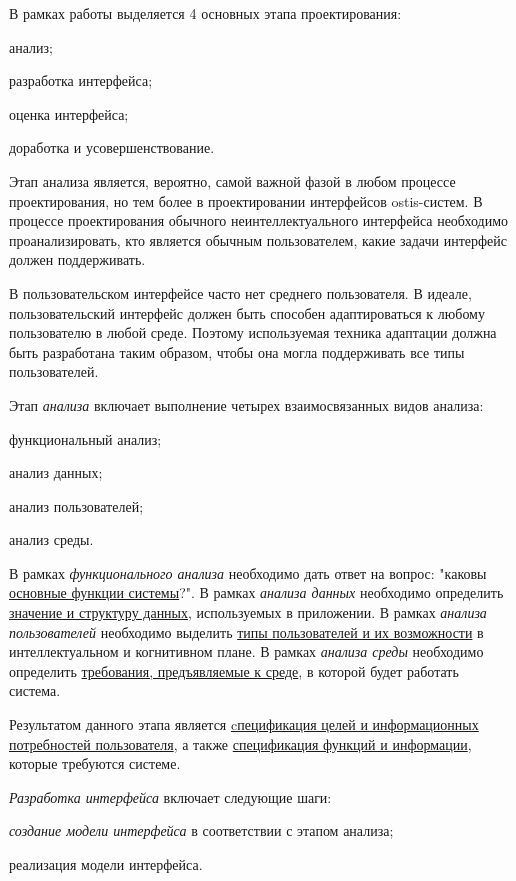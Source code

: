 В рамках работы  выделяется 4 основных этапа проектирования:
\begin{textitemize}
    \item анализ;
    \item разработка интерфейса;
    \item оценка интерфейса;
    \item доработка и усовершенствование.
\end{textitemize}

Этап анализа является, вероятно, самой важной фазой в любом процессе проектирования, но тем более в проектировании интерфейсов ostis-систем. В
процессе проектирования обычного неинтеллектуального интерфейса
необходимо проанализировать, кто является обычным пользователем, какие задачи интерфейс должен поддерживать. 

В пользовательском интерфейсе часто нет среднего пользователя.
В идеале, пользовательский интерфейс должен быть способен адаптироваться к любому пользователю в любой среде. Поэтому используемая техника адаптации должна быть разработана таким образом, чтобы она могла поддерживать все типы пользователей.

Этап \textit{анализа} включает выполнение четырех взаимосвязанных видов анализа:
\begin{textitemize}
    \item функциональный анализ;
    \item анализ данных;
    \item анализ пользователей;
    \item анализ среды.
\end{textitemize}

В рамках \textit{функционального анализа} необходимо дать ответ на вопрос: "каковы \uline{основные функции системы}?".
В рамках \textit{анализа данных} необходимо определить \uline{значение и структуру данных}, используемых в приложении.
В рамках \textit{анализа пользователей} необходимо выделить \uline{типы пользователей и их возможности} в интеллектуальном
и когнитивном плане.
В рамках \textit{анализа среды} необходимо определить \uline{требования, предъявляемые к среде}, в которой будет работать система.

Результатом данного этапа является \uline{cпецификация целей и информационных потребностей пользователя}, а также
\uline{спецификация функций и информации}, которые требуются системе.

\textit{Разработка интерфейса} включает следующие шаги:
\begin{textitemize}
	\item \textit{создание модели интерфейса} в соответствии с этапом анализа;
	\item реализация модели интерфейса.
\end{textitemize}

